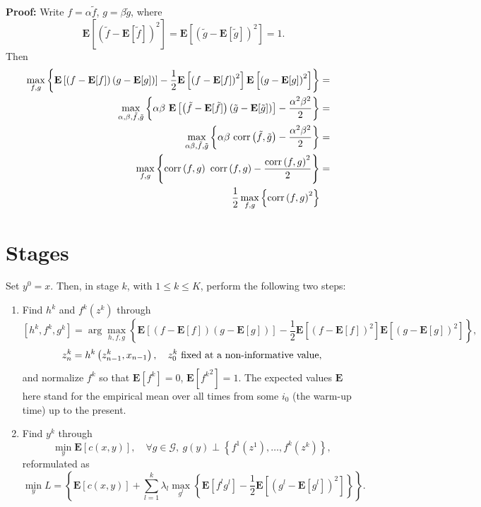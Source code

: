 \documentclass[a4paper,11pt]{article}
\newcommand{\E}{\mathbf E}
\theoremstyle{definition}
\begin{document}
\medskip
\noindent
{\bf Proof:} Write $f = \alpha \tilde{f}$, $g = \beta \tilde{g}$, where 
%
$$ \E\left[\left(\tilde{f} - \E[\tilde{f}]\right)^2\right] = \E\left[\left(\tilde{g} - \E[\tilde{g}]\right)^2\right] = 1.$$
%
Then
%
\begin{eqnarray*}
 \max_{f,g} \left\{\E\left[\left(f - \E[f]\right) \left(g - \E[g]\right) \right] - \frac{1}{2} \E\left[\left(f - \E[f]\right)^2\right] \E\left[\left(g - \E[g]\right)^2\right]\right\} &=& \\
 \max_{\alpha, \beta, \tilde{f},\tilde{g}} \left\{\alpha \beta\ \E\left[\left(\tilde{f} - \E[\tilde{f}]\right) \left(\tilde{g} - \E[\tilde{g}]\right) \right] - \frac{\alpha^2 \beta^2}{2} \right\} &=& \\
 \max_{\alpha \beta, \tilde{f},\tilde{g}} \left\{\alpha \beta \ \hbox{corr} \left(\tilde{f}, \tilde{g}\right) - \frac{\alpha^2 \beta^2}{2} \right\} &=& \\
 \max_{f,g} \left\{\hbox{corr} \left(f, g\right) \ \hbox{corr} \left(f, g\right) - \frac{\hbox{corr} \left(f, g\right)^2}{2} \right\} &=& \\
 \frac{1}{2}\max_{f,g} \left\{\hbox{corr} \left(f, g\right)^2 \right\} &&
\end{eqnarray*}


\section{Stages}


Set $y^0 = x$. Then, in stage $k$, with $1 \le k \le K$, perform the following two steps:


\begin{enumerate}


\item Find $h^k$ and $f^k(z^k)$ through
%
$$ \left[h^k, f^k, g^k\right] = \arg\max_{h,f,g} \left\{\E\left[\left(f - \E[f]\right) \left(g - \E[g]\right) \right] - \frac{1}{2} \E\left[\left(f - \E[f]\right)^2\right] \E\left[\left(g - \E[g]\right)^2\right]\right\} , $$
%
$$ z^k_n = h^k\left(z^k_{n-1}, x_{n-1} \right), \quad  z^k_0 \ \hbox{fixed at a non-informative value,} $$
%
and normalize $f^k$ so that $\E[f^k] = 0$, $\E[{f^k}^2] = 1$. The expected values $\E$ here stand for the empirical mean over all times from some $i_0$ (the warm-up time) up to the present.


\item Find $y^k$ through
%
$$ \min_y \E[c(x, y)], \quad \forall g \in \mathcal G, \  g(y) \perp \left\{f^1(z^1), \ldots, f^k(z^k) \right\}, $$
%
reformulated as
%
$$ \min_y L = \left\{\E[c(x, y)]  +  \sum_{l=1}^k  \lambda_l \max_{g^l} \left\{\E\left[f^l g^l \right] - \frac{1}{2} \E\left[\left(g^l - \E[g^l]\right)^2\right]\right\} \right\}. $$
%


\end{enumerate}
\end{document}
